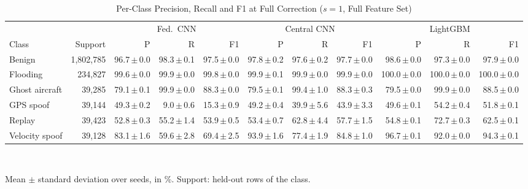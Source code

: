 \begin{table}[t]
\centering
\scriptsize
\caption{Per-Class Precision, Recall and F1 at Full Correction ($s=1$, Full Feature Set)}
\label{tab:perclass}
\setlength{\tabcolsep}{2pt}
\begin{tabular}{lrrrrrrrrrr}
\toprule
& & \multicolumn{3}{c}{Fed.\ CNN} & \multicolumn{3}{c}{Central CNN} & \multicolumn{3}{c}{LightGBM} \\
\cmidrule(lr){3-5}\cmidrule(lr){6-8}\cmidrule(lr){9-11}
Class & Support & P & R & F1 & P & R & F1 & P & R & F1 \\
\midrule
Benign & 1{,}802{,}785 & 96.7{\,}$\pm${\,}0.0 & 98.3{\,}$\pm${\,}0.1 & 97.5{\,}$\pm${\,}0.0 & 97.8{\,}$\pm${\,}0.2 & 97.6{\,}$\pm${\,}0.2 & 97.7{\,}$\pm${\,}0.0 & 98.6{\,}$\pm${\,}0.0 & 97.3{\,}$\pm${\,}0.0 & 97.9{\,}$\pm${\,}0.0 \\
Flooding & 234{,}827 & 99.6{\,}$\pm${\,}0.0 & 99.9{\,}$\pm${\,}0.0 & 99.8{\,}$\pm${\,}0.0 & 99.9{\,}$\pm${\,}0.1 & 99.9{\,}$\pm${\,}0.0 & 99.9{\,}$\pm${\,}0.0 & 100.0{\,}$\pm${\,}0.0 & 100.0{\,}$\pm${\,}0.0 & 100.0{\,}$\pm${\,}0.0 \\
Ghost aircraft & 39{,}285 & 79.1{\,}$\pm${\,}0.1 & 99.9{\,}$\pm${\,}0.0 & 88.3{\,}$\pm${\,}0.0 & 79.5{\,}$\pm${\,}0.1 & 99.4{\,}$\pm${\,}1.0 & 88.3{\,}$\pm${\,}0.3 & 79.5{\,}$\pm${\,}0.0 & 99.9{\,}$\pm${\,}0.0 & 88.5{\,}$\pm${\,}0.0 \\
GPS spoof & 39{,}144 & 49.3{\,}$\pm${\,}0.2 & 9.0{\,}$\pm${\,}0.6 & 15.3{\,}$\pm${\,}0.9 & 49.2{\,}$\pm${\,}0.4 & 39.9{\,}$\pm${\,}5.6 & 43.9{\,}$\pm${\,}3.3 & 49.6{\,}$\pm${\,}0.1 & 54.2{\,}$\pm${\,}0.4 & 51.8{\,}$\pm${\,}0.1 \\
Replay & 39{,}423 & 52.8{\,}$\pm${\,}0.3 & 55.2{\,}$\pm${\,}1.4 & 53.9{\,}$\pm${\,}0.5 & 53.4{\,}$\pm${\,}0.7 & 62.8{\,}$\pm${\,}4.4 & 57.7{\,}$\pm${\,}1.5 & 54.8{\,}$\pm${\,}0.1 & 72.7{\,}$\pm${\,}0.3 & 62.5{\,}$\pm${\,}0.1 \\
Velocity spoof & 39{,}128 & 83.1{\,}$\pm${\,}1.6 & 59.6{\,}$\pm${\,}2.8 & 69.4{\,}$\pm${\,}2.5 & 93.9{\,}$\pm${\,}1.6 & 77.4{\,}$\pm${\,}1.9 & 84.8{\,}$\pm${\,}1.0 & 96.7{\,}$\pm${\,}0.1 & 92.0{\,}$\pm${\,}0.0 & 94.3{\,}$\pm${\,}0.1 \\
\bottomrule
\end{tabular}
\\[2pt]
\parbox{\linewidth}{\scriptsize Mean $\pm$ standard deviation over  seeds, in \%. Support: held-out rows of the class.}
\end{table}
